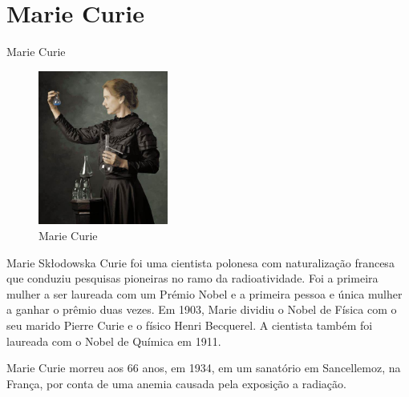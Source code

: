 \documentclass[presentation,professionalfonts,aspectratio=169]{beamer}
\begin{document}
\section{Marie Curie}
\label{sec:orga82ddac}
\begin{frame}[label={sec:org4e059dd}]{Marie Curie}
\vspace{-1.0cm}
\begin{figure}
\centering
\includegraphics[width=0.38\textwidth]{FQ/Radioatividade/Marie.jpeg}
\caption{Marie Curie}
\end{figure}

Marie Skłodowska Curie foi uma cientista polonesa com naturalização francesa que conduziu pesquisas pioneiras no ramo da radioatividade. Foi a primeira mulher a ser laureada com um Prémio Nobel e a primeira pessoa e única mulher a ganhar o prêmio duas vezes. Em 1903, Marie dividiu o Nobel de \alert{Física} com o seu marido Pierre Curie e o físico Henri Becquerel. A cientista também foi laureada com o Nobel de \alert{Química} em 1911.

Marie Curie morreu aos 66 anos, em 1934, em um sanatório em Sancellemoz, na França, por conta de uma anemia causada pela exposição a radiação.
\end{frame}
\end{document}
